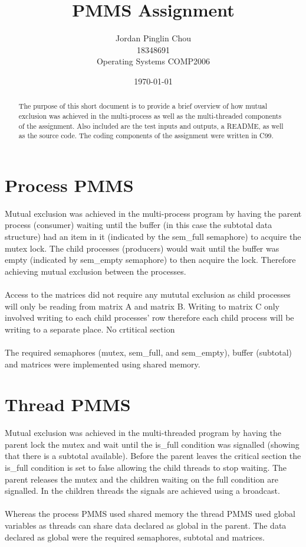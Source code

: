 \documentclass{article}
\begin{document}
\author{Jordan Pinglin Chou\\
  18348691\\
  Operating Systems COMP2006\\}
\date{\today}
\title{PMMS Assignment}
\maketitle

\begin{abstract}
  The purpose of this short document is to provide a brief overview of
  how mutual exclusion was achieved in the multi-process as well as
  the multi-threaded components of the assignment. Also included are
  the test inputs and outputs, a README, as well as the source code. The coding
  components of the assignment were written in C99.
\end{abstract}

\section{Process PMMS}
Mutual exclusion was achieved in the multi-process program by having the parent
process (consumer) waiting until the buffer (in this case the subtotal data structure)
had an item in it (indicated by the sem\_full semaphore) to acquire the mutex lock.
The child processes (producers) would wait until the buffer was empty (indicated
by sem\_empty semaphore) to then acquire the lock. Therefore achieving mutual
exclusion between the processes.
\\\\
Access to the matrices did not require any mututal exclusion as child processes
will only be reading from matrix A and matrix B. Writing to matrix C only
involved writing to each child processes’ row therefore each child process will
be writing to a separate place. No crtitical section
\\\\
The required semaphores (mutex, sem\_full, and sem\_empty), buffer (subtotal) and
matrices were implemented using shared memory.

\section{Thread PMMS}
Mutual exclusion was achieved in the multi-threaded program by having the
parent lock the mutex and wait until the is\_full condition was signalled
(showing that there is a subtotal available). Before the parent leaves the
critical section the is\_full condition is set to false allowing the child
threads to stop waiting. The parent releases the mutex and the children waiting
on the full condition are signalled. In the children threads the signals are
achieved using a broadcast.
\\\\
Whereas the process PMMS used shared memory the thread PMMS used global
variables as threads can share data declared as global in the parent. The data
declared as global were the required semaphores, subtotal and matrices.
\end{document}
